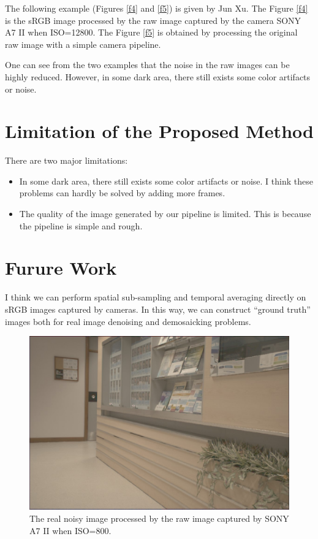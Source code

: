 \documentclass[10pt,twocolumn,letterpaper]{article}
\begin{document}
The following example (Figures \ref{f4} and \ref{f5}) is given by Jun Xu. The 
Figure \ref{f4} is the sRGB image processed by the raw image captured by the camera SONY A7 II when ISO=12800. The Figure \ref{f5} is obtained by processing the original raw image with a simple camera pipeline.

One can see from the two examples that the noise in the raw images can be highly reduced. However, in some dark area, there still exists some color artifacts or noise. 

\section{Limitation of the Proposed Method}
There are two major limitations:
\begin{itemize}
\item In some dark area, there still exists some color artifacts or noise. I think these problems can hardly be solved by adding more frames. 
\item The quality of the image generated by our pipeline is limited. This is because the pipeline is simple and rough. 
\end{itemize}

\section{Furure Work}

I think we can perform spatial sub-sampling and temporal averaging directly on sRGB images captured by cameras. In this way, we can construct ``ground truth'' images both for real image denoising and demosaicking problems.


\begin{figure}
\centering
\includegraphics[width=0.8\linewidth]{resize_DSC01764.JPG}
\vspace{-4mm}
\caption{The real noisy image processed by the raw image captured by SONY A7 II when ISO=800.
}
\label{f2}
\end{figure}
\end{document}

